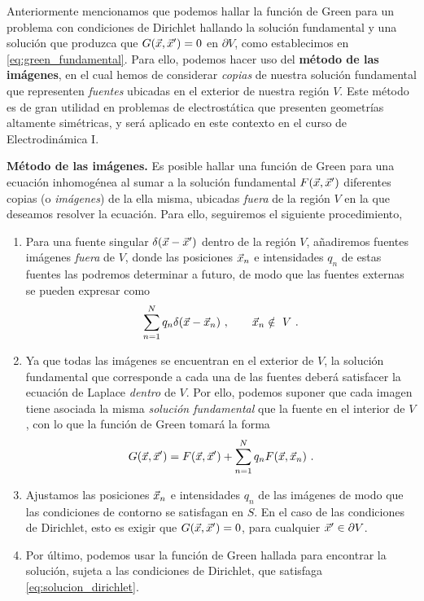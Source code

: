 Anteriormente mencionamos que podemos hallar la función de Green para un problema con condiciones de Dirichlet hallando la solución fundamental y una solución que produzca que $G(\vec{x},\vec{x}') = 0$ en $\partial V$, como establecimos en \eqref{eq:green_fundamental}. Para ello, podemos hacer uso del \textbf{método de las imágenes}, en el cual hemos de considerar \emph{copias} de nuestra solución fundamental que representen \emph{fuentes} ubicadas en el exterior de nuestra región $V$. Este método es de gran utilidad en problemas de electrostática que presenten geometrías altamente simétricas, y será aplicado en este contexto en el curso de Electrodinámica I.
\begin{propo} 
    \textbf{Método de las imágenes.} Es posible hallar una función de Green para una ecuación inhomogénea al sumar a la solución fundamental $F(\vec{x}, \vec{x}')$ diferentes copias (o \emph{imágenes}) de la ella misma, ubicadas \emph{fuera} de la región $V$ en la que deseamos resolver la ecuación. Para ello, seguiremos el siguiente procedimiento,
    \begin{enumerate}
        \item Para una fuente singular $\delta(\vec{x} - \vec{x}')$ dentro de la región $V$, añadiremos fuentes imágenes \emph{fuera} de $V$, donde las posiciones $\vec{x}_n$ e intensidades $q_n$ de estas fuentes las podremos determinar a futuro, de modo que las fuentes externas se pueden expresar como
        \begin{equation}
            \sum_{n=1}^N q_n \delta(\vec{x} - \vec{x}_n) \ , \qquad \vec{x}_n \notin \ V \ .
        \end{equation}
    
        \item Ya que todas las imágenes se encuentran en el exterior de $V$, la solución fundamental que corresponde a cada una de las fuentes deberá satisfacer la ecuación de Laplace \emph{dentro} de $V$. Por ello, podemos suponer que cada imagen tiene asociada la misma \emph{solución fundamental} que la fuente en el interior de $V$, con lo que la función de Green tomará la forma
        \begin{equation}
            G(\vec{x}, \vec{x}') = F(\vec{x}, \vec{x}') + \sum_{n=1}^N q_n F(\vec{x},\vec{x}_n) \ .
        \end{equation}
    
        \item Ajustamos las posiciones $\vec{x}_n$ e intensidades $q_n$ de las imágenes de modo que las condiciones de contorno se satisfagan en $S$. En el caso de las condiciones de Dirichlet, esto es exigir que $G(\vec{x}, \vec{x}') = 0$, para cualquier $\vec{x}' \in \partial V$.
    
        \item Por último, podemos usar la función de Green hallada para encontrar la solución, sujeta a las condiciones de Dirichlet, que satisfaga \eqref{eq:solucion_dirichlet}.
    \end{enumerate}
\end{propo}

